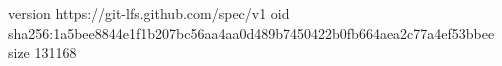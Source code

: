 version https://git-lfs.github.com/spec/v1
oid sha256:1a5bee8844e1f1b207bc56aa4aa0d489b7450422b0fb664aea2c77a4ef53bbee
size 131168
